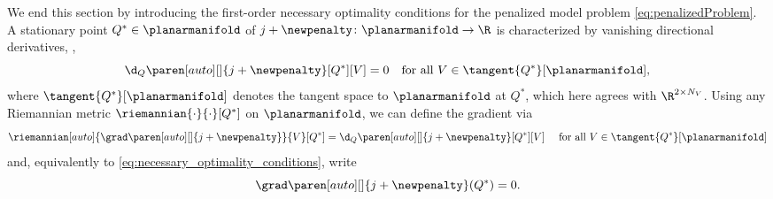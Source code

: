 We end this section by introducing the first-order necessary optimality conditions for the penalized model problem \eqref{eq:penalizedProblem}.
A stationary point $Q^* \in \planarmanifold$ of $j + \newpenalty \colon \planarmanifold\rightarrow \R$ is characterized by vanishing directional derivatives, \ie,
\begin{equation}
	\label{eq:necessary_optimality_conditions}
	\d_Q \paren[auto][]{j + \newpenalty}[Q^*][V]
	=
	0
	\quad
	\text{for all }
	V \in \tangent{Q^*}[\planarmanifold],
\end{equation}
where $\tangent{Q^*}[\planarmanifold]$ denotes the tangent space to $\planarmanifold$ at $Q^*$, which here agrees with $\R^{2 \times N_V}$.
Using any Riemannian metric $\riemannian{\cdot}{\cdot}[Q^*]$ on $\planarmanifold$, we can define the gradient via
\begin{equation}
	\label{eq:definition_riemannian_gradient}
	\riemannian[auto]{\grad \paren[auto][]{j + \newpenalty}}{V}[Q^*]
	=
	\d_Q \paren[auto][]{j + \newpenalty}[Q^*][V]
	\quad
	\text{ for all }
	V \in \tangent{Q^*}[\planarmanifold]
\end{equation}
and, equivalently to \eqref{eq:necessary_optimality_conditions}, write
\begin{equation}
	\label{eq:necessary_optimality_conditions_using_gradient}
	\grad \paren[auto][]{j + \newpenalty}(Q^*)
	=
	0
	.
\end{equation}

